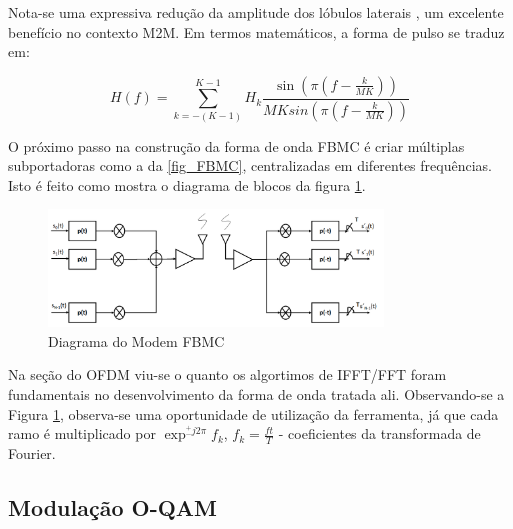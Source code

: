 \par Nota-se uma expressiva redução da amplitude dos lóbulos laterais \cite{Bellanger}, um excelente benefício no contexto M2M. Em termos matemáticos, a forma de pulso se traduz em\cite{Bellanger}: 

\begin{equation}\label{eq_freq}
H(f) = \sum_{k=-(K-1)}^{K-1}H_{k}\frac{\sin(\pi(f-\frac{k}{MK}))}{MKsin(\pi(f-\frac{k}{MK}))}
\end{equation}

\par O próximo passo na construção da forma de onda FBMC é criar múltiplas subportadoras como a da \ref{fig_FBMC}, centralizadas em diferentes frequências. Isto é feito como mostra o diagrama de blocos da figura \ref{Trans_FBMC}. 

\begin{figure}[h!]
\centering
\includegraphics[width=3.5in]{transceptor_FDM.png}
\caption{Diagrama do Modem FBMC \cite{Boroujeny}}
\label{Trans_FBMC}
\end{figure}

\par Na seção do OFDM viu-se o quanto os algortimos de IFFT/FFT foram fundamentais no desenvolvimento da forma de onda tratada ali. Observando-se a Figura \ref{Trans_FBMC}, observa-se uma oportunidade de utilização da ferramenta, já que cada ramo é multiplicado por $\exp^{^{+}_{-} j2\pi}{f_{k}}$, $f_{k} = \frac{ft}{T}$ - coeficientes da transformada de Fourier. 


\subsection{Modulação O-QAM} 

